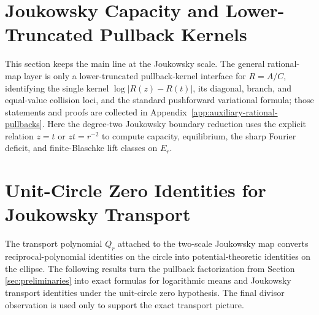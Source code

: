 \documentclass[12pt,a4paper]{article}
\theoremstyle{plain}
\theoremstyle{definition}
\numberwithin{equation}{section}
\newcommand{\dd}{\,\mathrm{d}}
\begin{document}
\begin{abstract}
The final synthesis combines the analytic and algebraic layers only
after the Joukowsky specialization above.  A quantitative annular
Rouch\'e theorem gives only local contour-selected annular divisor
zero-count stability after exact model identification and fixed
separating contours, while exact unit-circle realizability is checked by
the separate reciprocal-shell algebraic criterion.  From the same
exact complete coefficient-vector and shell data one recovers the fixed-scale
object \((\log r,E_r,J_{r\ast}(\dd\theta/2\pi),Q_r(P),P)\); the
remaining measure-theoretic ambiguity is precisely the finite-Blaschke
Haar-lift fiber.
\end{abstract}



\section{Joukowsky Capacity and Lower-Truncated Pullback Kernels}\label{sec:rational-capacity}

This section keeps the main line at the Joukowsky scale.  The general
rational-map layer is only a lower-truncated pullback-kernel interface
for \(R=A/C\), identifying the single kernel \(\log|R(z)-R(t)|\), its
diagonal, branch, and equal-value collision loci, and the standard
pushforward variational formula; those statements and proofs are
collected in Appendix~\ref{app:auxiliary-rational-pullbacks}.  Here the
degree-two Joukowsky boundary reduction uses the explicit relation
\(z=t\) or \(zt=r^{-2}\) to compute capacity, equilibrium, the sharp
Fourier deficit, and finite-Blaschke lift classes on \(E_r\).



\section{Unit-Circle Zero Identities for Joukowsky Transport}\label{sec:mahler-transport}

The transport polynomial \(Q_r\) attached to the two-scale Joukowsky map converts reciprocal-polynomial identities on the circle into potential-theoretic identities on the ellipse. The following results turn the pullback factorization from Section \ref{sec:preliminaries} into exact formulas for logarithmic means and Joukowsky transport identities under the unit-circle zero hypothesis.  The final divisor observation is used only to support the exact transport picture.
\end{document}
